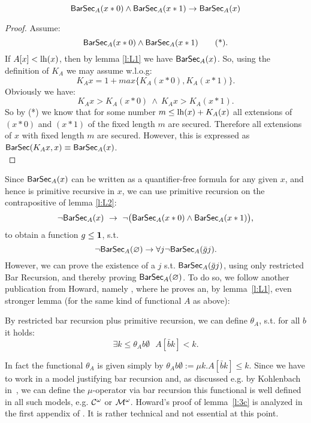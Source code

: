 \begin{lemma}
\label{l:L2}
\[ \textsf{\upshape BarSec}_A(x*0) \wedge \textsf{\upshape BarSec}_A(x*1) \rightarrow \textsf{\upshape BarSec}_A(x) \]
\end{lemma}
\begin{proof}
Assume:
\[ \textsf{\upshape BarSec}_A(x*0) \wedge \textsf{\upshape BarSec}_A(x*1)  \tag{*} \text{.}\]
If $A[x]<\operatorname{lh}(x)$, then by lemma \ref{l:L1} we have $\textsf{\upshape BarSec}_A(x)$. 
So, using the definition of $K_A$ we may assume w.l.o.g:
\[ K_Ax=1+max\{K_A(x*0),K_A(x*1)\} \text{.}\]
Obviously we have:
\[ K_Ax > K_A(x*0)\ \wedge\ K_Ax>K_A(x*1)\text{.}\]
So by (*) we know that for some number $m\leq\operatorname{lh}(x)+K_A(x)$ all extensions 
of $(x*0)$ and $(x*1)$ of the fixed length $m$ are secured. Therefore all extensions
of $x$ with fixed length $m$ are secured. However, this is 
expressed as $\textsf{\upshape BarSec}(K_Ax,x)\equiv \textsf{\upshape BarSec}_A(x)$.\\
\end{proof}

Since $\textsf{\upshape BarSec}_A(x)$ can be written as a quantifier-free formula for any given $x$, and
hence is primitive recursive in $x$, 
we can use primitive recursion on the contrapositive of lemma \ref{l:L2}:
\[ \neg \textsf{\upshape BarSec}_A(x)\ \rightarrow \ \neg \big(\textsf{\upshape BarSec}_A(x*0)\wedge \textsf{\upshape BarSec}_A(x*1)\big) \text{,}\]
to obtain a function $g\leq\mathbf1$, s.t.
\[ \neg \textsf{\upshape BarSec}_A(\varnothing) \rightarrow \forall j \neg \textsf{\upshape BarSec}_A(\bar gj) \text{.}\]
However, we can prove the existence of a $j$ s.t. $\textsf{\upshape BarSec}_A(\bar gj)$, 
using only restricted Bar Recursion, and thereby proving $\textsf{\upshape BarSec}_A(\varnothing)$.
To do so, we follow another publication from Howard, namely \cite{Howard68},
where he proves an, by lemma~\ref{l:L1}, even stronger lemma 
(for the same kind of functional $A$ as above):
%
%
\begin{lemma}\label{l:3c}
By restricted bar recursion plus primitive recursion, 
we can define $\theta_A$, s.t. for 
all $b$ it holds:
\[\exists k\leq \theta_Ab \emptyset\ \ \ A[\bar b k]<k\text{.}\]
\end{lemma}
%
\begin{rmk}
In fact the functional $\theta_A$ is given simply by 
$\theta_Ab\emptyset:=\mu k.A[\bar bk]\leq k$. 
Since we have to work in a model justifying bar recursion
and, as discussed e.g. by Kohlenbach in~\cite{Kohlenbach08}, we can define the $\mu$-operator
via bar recursion this functional is well defined in all such models, e.g. $\mathcal{C} ^\omega$ or $\mathcal{M} ^\omega$. 
Howard's proof of lemma~\ref{l:3c} is analyzed in the first appendix of \cite{Safarik08}. It is
rather technical and not essential at this point.
\end{rmk}
%


